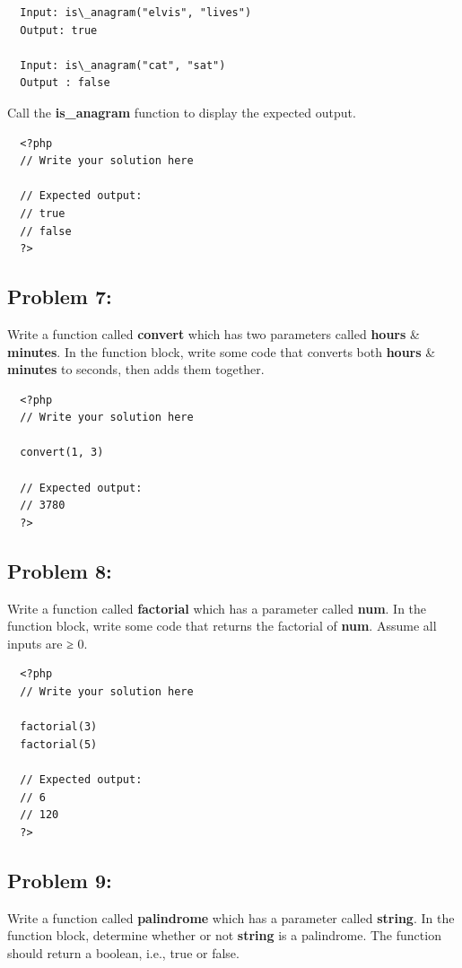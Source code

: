 \documentclass{article}
\begin{document}
\begin{verbatim}
  Input: is\_anagram("elvis", "lives")
  Output: true

  Input: is\_anagram("cat", "sat")
  Output : false
\end{verbatim}

Call the \textbf{is\_anagram} function to display the expected output.

\begin{verbatim}
  <?php  
  // Write your solution here

  // Expected output:
  // true
  // false
  ?>
\end{verbatim}

\subsection*{Problem 7:}
Write a function called \textbf{convert} which has two parameters called \textbf{hours} \& \textbf{minutes}. In the function block, write some code that converts both \textbf{hours} \& \textbf{minutes} to seconds, then adds them together.

\begin{verbatim}
  <?php  
  // Write your solution here

  convert(1, 3)

  // Expected output:
  // 3780
  ?>
\end{verbatim}

\subsection*{Problem 8:}
Write a function called \textbf{factorial} which has a parameter called \textbf{num}. In the function block, write some code that returns the factorial of \textbf{num}. Assume all inputs are ≥ 0. 

\begin{verbatim}
  <?php  
  // Write your solution here

  factorial(3)
  factorial(5)

  // Expected output:
  // 6
  // 120
  ?>
\end{verbatim}

\subsection*{Problem 9:}
Write a function called \textbf{palindrome} which has a parameter called \textbf{string}. In the function block, determine whether or not \textbf{string} is a palindrome. The function should return a boolean, i.e., true or false.
\end{document}
